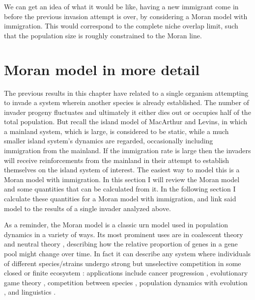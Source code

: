 We can get an idea of what it would be like, having a new immigrant come in before the previous invasion attempt is over, by considering a Moran model with immigration.
This would correspond to the complete niche overlap limit, such that the population size is roughly constrained to the Moran line. %


\section{Moran model in more detail}
The previous results in this chapter have related to a single organism attempting to invade a system wherein another species is already established. 
The number of invader progeny fluctuates and ultimately it either dies out or occupies half of the total population. 
But recall the island model of MacArthur and Levins, in which a mainland system, which is large, is considered to be static, while a much smaller island system's dynamics are regarded, occasionally including immigration from the mainland. 
If the immigration rate is large then the invaders will receive reinforcements from the mainland in their attempt to establish themselves on the island system of interest. 
The easiest way to model this is a Moran model with immigration. 
In this section I will review the Moran model and some quantities that can be calculated from it. 
In the following section I calculate these quantities for a Moran model with immigration, and link said model to the results of a single invader analyzed above. 

As a reminder, the Moran model \cite{Moran1962} is a classic urn model used in population dynamics in a variety of ways.
Its most prominent uses are in coalescent theory \cite{Blythe2007,Etheridge2010} and neutral theory \cite{Kimura1956,Bell2000,Hubbell2001}, describing how the relative proportion of genes in a gene pool might change over time. 
In fact it can describe any system where individuals of different species/strains undergo strong but unselective competition in some closed or finite ecosystem \cite{Claussen2005}: applications include cancer progression \cite{Ashcroft2015}, evolutionary game theory \cite{Tayloer2004,Antal2006,Hilbe2011}, competition between species \cite{Houchmandzadeh2010,Blythe2011,Constable2015}, population dynamics with evolution \cite{Traulsen2006}, and linguistics \cite{Blythe2007}. 


